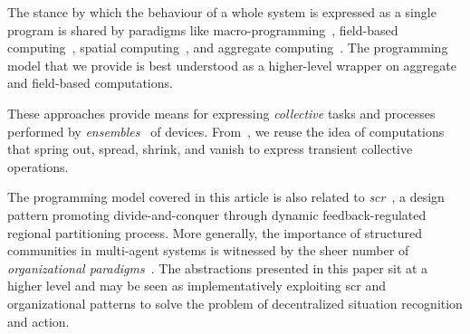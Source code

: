 The
stance
 by which the behaviour of a whole system
 is expressed as a single program
 is shared by paradigms
 like
 macro-programming~\cite{DBLP:journals/csur/MottolaP11},
field-based computing~\cite{DBLP:journals/jlap/ViroliBDACP19},
 spatial computing~\cite{DBLP:books/daglib/0029568}, 
and
aggregate computing~\cite{DBLP:journals/computer/BealPV15}.
%
The programming model that we provide 
 is best understood as a higher-level wrapper
 on aggregate and field-based computations.

These approaches provide means
 for expressing \emph{collective} tasks and processes~\cite{DBLP:journals/tetc/ScekicSVRTMD20,DBLP:journals/eaai/CasadeiVAPD21}
 performed by \emph{ensembles}~\cite{DBLP:journals/computer/BuresPKTH16}
 of devices.
%
From~\cite{DBLP:journals/eaai/CasadeiVAPD21},
 we reuse the idea of 
 computations 
 that spring out,
 spread, shrink, and vanish to express transient collective operations.
%

The programming model covered in this article
is also related to \emph{\ac{scr}}~\cite{DBLP:journals/fgcs/PianiniCVN21},
a design pattern
promoting divide-and-conquer through dynamic feedback-regulated regional partitioning process.
%
%
More generally,
the  importance of structured communities
in multi-agent systems
is witnessed by the sheer number of
\emph{organizational paradigms}~\cite{DBLP:journals/ker/HorlingL04}.
%
The abstractions presented in this paper 
 sit at a higher level %
 and may be seen as implementatively exploiting \ac{scr} and organizational patterns %
 to solve the problem of decentralized situation recognition and action.
%

